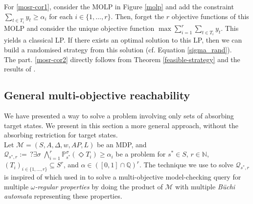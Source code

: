\begin{proof2}
  For \ref{mosr-cor1}, consider the MOLP in Figure \ref{molp} and add the constraint $\sum_{t \in T_i} y_t \geq \alpha_i$ for each $i \in \{1, \dots, r\}$. Then,
  forget the $r$ objective functions of this MOLP and consider the unique objective function $\max \sum_{i=1}^r\sum_{t \in T_i} y_t$.
  This yields a classical LP. If there exists an optimal solution to this LP, then we can
  build a randomised strategy from this solution (cf. Equation \ref{sigma_rand}).\\
  The part. \ref{mosr-cor2} directly follows from Theorem \ref{feasible-strategy} and the results of \cite{DBLP:conf/focs/PapadimitriouY00}. \flushright
\end{proof2}

\subsection{General multi-objective reachability}
We have presented a way to solve a \MOSR{} problem involving only sets of absorbing target states.
We present in this section a more general approach, without the absorbing restriction for target states.\\

Let $\mathcal{M}=(S, A, \Delta, w, AP, L)$ be an MDP, and
$
  \mathcal{Q}_{s^*, r} := \,?\exists \sigma\; \bigwedge_{i=1}^r \mathbb{P}^\sigma_{s^*}(\Diamond T_i) \geq \alpha_i
$
be a \MOSR{} problem for $s^* \in S$, $r \in \mathbb{N}$, $(T_i)_{i \in \{1, \dots, r\}} \subseteq S^r$, and $\alpha \in ([0, 1] \cap \mathbb{Q})^r$.
The technique we use to solve $\mathcal{Q}_{s^*, r}$ is inspired of which used in \cite{DBLP:journals/lmcs/EtessamiKVY08} to solve a multi-objective model-checking query for multiple \textit{$\omega$-regular properties} by doing the product of $\mathcal{M}$ with multiple \textit{Büchi automata} representing these properties. \\

